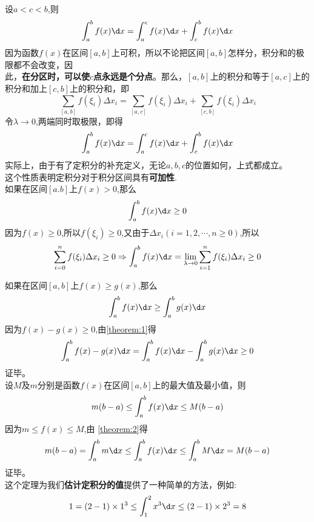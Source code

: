 \theorem[定上下限积分性质2]
设$a<c<b$,则
\begin{equation}
	\int_{a}^{b}f(x)\d x=\int_{a}^{c}f(x)\d x+\int_{c}^{b}f(x)\d x
\end{equation}
\proof 因为函数$f(x)$在区间$[a,b]$上可积，所以不论把区间$[a,b]$怎样分，积分和的极限都不会改变，因\vspace{-0.5em}\\ 此，\textbf{在分区时，可以使$c$点永远是个分点}。那么，$[a,b]$上的积分和等于$[a,c]$上的积分和加上$[c,b]$上的积分和，即
\begin{equation}
	\sum_{[a,b]}f(\xi_i)\Delta x_i=\sum_{[a,c]}f(\xi_i)\Delta x_i+\sum_{[c,b]}f(\xi_i)\Delta x_i
\end{equation}
令$\lambda\to0$,两端同时取极限，即得
\begin{equation}
	\int_{a}^{b}f(x)\d x=\int_{a}^{c}f(x)\d x+\int_{c}^{b}f(x)\d x
\end{equation}
\kg 实际上，由于有了定积分的补充定义，无论$a,b,c$的位置如何，上式都成立。\\
\kg 这个性质表明定积分对于积分区间具有\textbf{可加性}.\\

\theorem[定上下限积分性质3]
\label{theorem:1}
如果在区间$[a.b]$上$f(x)>0$,那么
\begin{equation}
	\int_{a}^{b}f(x)\d x\geq0
\end{equation}
\proof 因为$f(x)\geq 0$,所以$f(\xi_i)\geq0$,又由于$\Delta x_i(i=1,2,\cdots,n\geq0)$,所以\sj
\begin{equation}
	\sum_{i=0}^{n}f(\xi_i)\Delta x_i\geq0 \Rightarrow \int_{a}^{b}f(x)\d x=\lim\limits_{\lambda\to0}\sum_{i=1}^{n}f(\xi_i)\Delta x_i\geq 0
\end{equation}

\theorem[定上下限积分性质4]
\label{theorem:2}
如果在区间$[a,b]$上$f(x)\geq g(x)$,那么
\begin{equation}
	\int_{a}^{b}f(x)\d x\geq \int_{a}^{b}g(x)\d x
\end{equation}
\proof 因为$f(x)-g(x)\geq0$,由\ref{theorem:1}\hspace*{0.3em}得
\begin{equation}
	\int_{a}^{b}f(x)-g(x)\d x=\int_{a}^{b}f(x)\d x-\int_{a}^{b}g(x)\d x\geq0
\end{equation}
证毕。\\

\sj
\theorem[定上下限积分性质5]
\label{theorem:3}
设$M$及$m$分别是函数$f(x)$在区间$[a,b]$上的最大值及最小值，则
\begin{equation}
	m(b-a)\leq \int_{a}^{b}f(x)\d x\leq M(b-a)
\end{equation}
\proof 因为$m\leq f(x)\leq M$,由 \ref{theorem:2}\hspace*{0.3em}得
\sj 
\begin{equation}
	\nonumber
	m(b-a)=\int_{a}^{b}m\d x\leq \int_{a}^{b}f(x)\d x\leq \int_{a}^{b}M\d x=M(b-a)
\end{equation}
证毕。\\
\kg 这个定理为我们\textbf{估计定积分的值}提供了一种简单的方法，例如:
\begin{equation}
	\nonumber
	1=(2-1)\times1^3\leq \int_{1}^{2}x^3\d x\leq (2-1)\times2^3=8
\end{equation}

